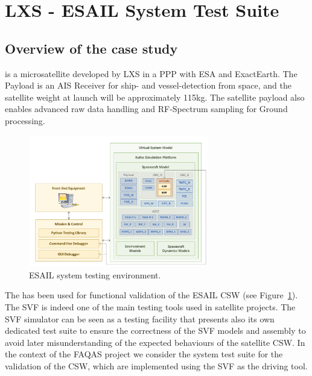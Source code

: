 
\section{LXS - ESAIL System Test Suite}
\label{chapter:caseStudies:LXS}

\subsection{Overview of the case study}

 is a microsatellite developed by LXS in a PPP with ESA and ExactEarth.
The Payload is an AIS Receiver for ship- and vessel-detection from space, and the satellite weight at launch will be approximately 115kg. The satellite payload also enables advanced raw data handling and RF-Spectrum sampling for Ground processing.

\begin{figure}[h]
	\centering
    \includegraphics[width=0.7\textwidth]{images/esail}
    \caption{ESAIL system testing environment.}
    \label{fig:esail_case_study}
\end{figure}

The  has been used for functional validation of the ESAIL CSW (see Figure~\ref{fig:esail_case_study}). The SVF is indeed one of the main testing tools used in satellite projects. The SVF simulator can be seen as a testing facility that presents also its own dedicated test suite to ensure the correctness of the SVF models and assembly to avoid later misunderstanding of the expected behaviours of the satellite CSW.
In the context of the FAQAS project we consider the system test suite for the validation of the CSW, which are implemented using the SVF as the driving tool.

